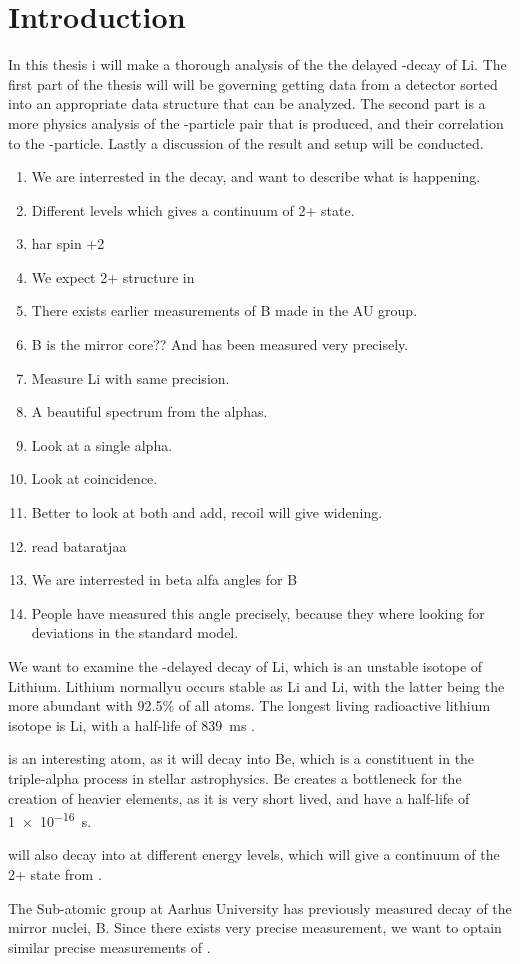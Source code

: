 \chapter{Introduction}
In this thesis i will make a thorough analysis of the the delayed \be-decay of \isotope[8]Li. The first part of the thesis will will be governing getting data from a detector sorted into an appropriate data structure that can be analyzed. 
The second part is a more physics analysis of the \al-particle pair that is produced, and their correlation to the \be-particle.
Lastly a discussion of the result and setup will be conducted. 

\begin{enumerate}
	\item We are interrested in the decay, and want to describe what is happening.
	\item Different levels which gives a continuum of 2+ state.
	\item {} har spin +2
	\item We expect 2+ structure in 
	\item There exists earlier measurements of \isotope[8]B	made in the AU group.
	\item \isotope[8]B is the mirror core?? And has been measured very precisely.
	\item Measure Li with same precision.
	\item A beautiful spectrum from the alphas.
	\item Look at a single alpha.
	\item Look at coincidence.
	\item Better to look at both and add, recoil will give widening.
	\item read bataratjaa
	\item We are interrested in beta alfa angles for \isotope[12]B
	\item People have measured this angle precisely, because they where looking for deviations in the standard model.
\end{enumerate}

We want to examine the \be-delayed decay of \isotope[8]Li, which is an unstable isotope of Lithium. Lithium normallyu occurs stable as \isotope[6]Li and \isotope[7]Li, with the latter being the more abundant with 92.5\% of all atoms. The longest living radioactive lithium isotope is \isotope[8]Li, with a half-life of \SI{839}{ms} . 

\li is an interesting atom, as it will decay into \isotope[8]Be, which is a constituent in the triple-alpha process in stellar astrophysics. \isotope[8]Be creates a bottleneck for the creation of heavier elements, as it is very short lived, and have a half-life of \SI{1e-16}{s}.

\li will also decay into \ber at different energy levels, which will give a continuum of the 2+ state from \li. 

The Sub-atomic group at Aarhus University has previously measured decay of the mirror nuclei, \isotope[8]B. Since there exists very precise measurement, we want to optain similar precise measurements of \li. 